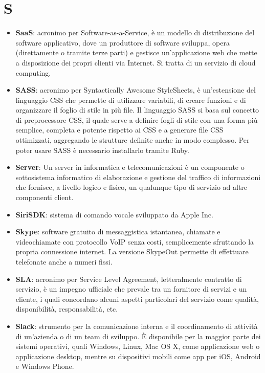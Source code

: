 \section{S}
\begin{itemize}
	\item \textbf{SaaS}: acronimo per Software-as-a-Service, è un modello di distribuzione del software applicativo, dove un produttore di software sviluppa, opera (direttamente o tramite terze parti) e gestisce un'applicazione web che mette a disposizione dei propri clienti via Internet. Si tratta di un servizio di cloud computing.
	\item \textbf{SASS}: acronimo per Syntactically Awesome StyleSheets, è un'estensione del linguaggio CSS che permette di utilizzare variabili, di creare funzioni e di organizzare il foglio di stile in più file. Il linguaggio SASS si basa sul concetto di preprocessore CSS, il quale serve a definire fogli di stile con una forma più semplice, completa e potente rispetto ai CSS e a generare file CSS ottimizzati, aggregando le strutture definite anche in modo complesso. Per poter usare SASS è necessario installarlo tramite Ruby.
	\item \textbf{Server}: Un server in informatica e telecomunicazioni è un componente o sottosistema informatico di elaborazione e gestione del traffico di informazioni che fornisce, a livello logico e fisico, un qualunque tipo di servizio ad altre componenti client.
	\item \textbf{SiriSDK}: sistema di comando vocale sviluppato da Apple Inc.
	\item \textbf{Skype}: software gratuito di messaggistica istantanea, chiamate e videochiamate con protocollo VoIP senza costi, semplicemente sfruttando la propria connessione internet. La versione SkypeOut permette di effettuare telefonate anche a numeri fissi.
	\item \textbf{SLA}: acronimo per Service Level Agreement, letteralmente contratto di servizio, è un impegno ufficiale che prevale tra un fornitore di servizi e un cliente, i quali concordano alcuni aspetti particolari del servizio come qualità, disponibilità, responsabilità, etc.
	\item \textbf{Slack}: strumento per la comunicazione interna e il coordinamento di attività di un'azienda o di un team di sviluppo. \MakeUppercase{è} disponibile per la maggior parte dei sistemi operativi, quali Windows, Linux, Mac OS X, come applicazione web o applicazione desktop, mentre su dispositivi mobili come app per iOS, Android e Windows Phone.

\end{itemize}
